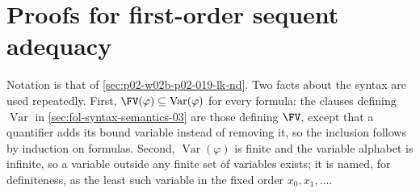 \section{Proofs for first-order sequent adequacy}
\label{sec:annex-p02-w02b-p02-019-lk-nd}

Notation is that of \cref{sec:p02-w02b-p02-019-lk-nd}.  Two facts about the
syntax are used repeatedly.  First, \(\FV(\varphi)\subseteq
\operatorname{Var}(\varphi)\) for every formula: the clauses defining \(\operatorname{Var}\) in
\cref{sec:fol-syntax-semantics-03} are those defining \(\FV\), except that a
quantifier adds its bound variable instead of removing it, so the inclusion follows by induction
on formulas.  Second, \(\operatorname{Var}(\varphi)\) is finite and the
variable alphabet is infinite, so a variable outside any finite set of
variables exists; it is named, for definiteness, as the least such variable
in the fixed order \(x_0,x_1,\ldots\).

